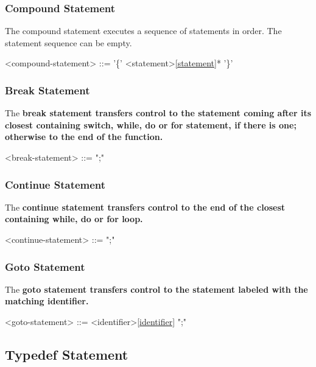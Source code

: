 \documentclass[a4paper,oneside,11pt]{article}
\begin{document}
\subsubsection{Compound Statement}

The compound statement executes a sequence of statements in order. The statement sequence can be empty.

\begin{grammar}
\label{compound-statement}<compound-statement> ::= '\{' <statement>\ref{statement}* '\}'
\end{grammar}

\subsubsection{Break Statement}

The \bf{break} statement transfers control to the statement coming after its closest containing \bf{switch}, \bf{while}, \bf{do} or \bf{for} statement,
if there is one; otherwise to the end of the function.

\begin{grammar}
\label{break-statement}<break-statement> ::=  ";"
\end{grammar}

\subsubsection{Continue Statement}

The \bf{continue} statement transfers control to the end of the closest containing \bf{while}, \bf{do} or \bf{for} loop.

\begin{grammar}
\label{continue-statement}<continue-statement> ::=  ";"
\end{grammar}

\subsubsection{Goto Statement}

The \bf{goto} statement transfers control to the statement labeled with the matching identifier.

\begin{grammar}
\label{goto-statement}<goto-statement> ::=  <identifier>\ref{identifier} ";"
\end{grammar}

\subsection{Typedef Statement}
\end{document}
